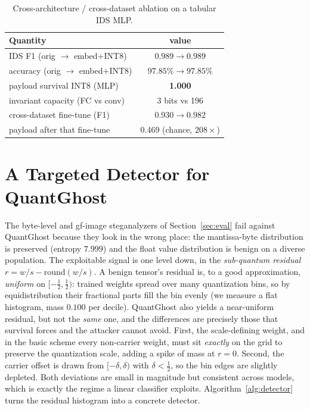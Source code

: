 \documentclass[a4paper,fleqn]{cas-dc}
\theoremstyle{plain}
\theoremstyle{remark}
\newcommand{\sys}{\mbox{QuantGhost}}
\begin{document}
\begin{table}[!tb]\centering
\caption{Cross-architecture / cross-dataset ablation on a tabular IDS MLP.}
\label{tab:ablation}
\begin{tabular*}{\columnwidth}{@{\extracolsep{\fill}}lc@{}}
\toprule
Quantity & value\\
\midrule
IDS F1 (orig $\to$ embed$+$INT8) & $0.989\to0.989$\\
accuracy (orig $\to$ embed$+$INT8) & $97.85\%\to97.85\%$\\
payload survival INT8 (MLP) & \textbf{1.000}\\
invariant capacity (FC vs conv) & 3 bits vs 196\\
cross-dataset fine-tune (F1) & $0.930\to0.982$\\
\quad payload after that fine-tune & 0.469 (chance, $208\times$)\\
\bottomrule
\end{tabular*}
\end{table}

\section{A Targeted Detector for \sys}\label{sec:detector}
The byte-level and gf-image steganalyzers of Section~\ref{sec:eval} fail against \sys{}
because they look in the wrong place: the mantissa-byte distribution is preserved
(entropy $7.999$) and the float value distribution is benign on a diverse population.
The exploitable signal is one level down, in the \emph{sub-quantum residual}
$r=w/s-\mathrm{round}(w/s)$. A benign tensor's residual is, to a good approximation,
\emph{uniform} on $[-\tfrac12,\tfrac12)$: trained weights spread over many quantization
bins, so by equidistribution their fractional parts fill the bin evenly (we measure a flat
histogram, mass $0.100$ per decile). \sys{} also yields a near-uniform residual, but not the
\emph{same} one, and the differences are precisely those that survival forces and the
attacker cannot avoid. First, the scale-defining weight, and in the basic scheme every
non-carrier weight, must sit \emph{exactly} on the grid to preserve the quantization scale,
adding a spike of mass at $r=0$. Second, the carrier offset is drawn from $[-\delta,\delta)$
with $\delta<\tfrac12$, so the bin edges are slightly depleted. Both deviations are small in
magnitude but consistent across models, which is exactly the regime a linear classifier
exploits. Algorithm~\ref{alg:detector} turns the residual histogram into a concrete detector.
\end{document}
